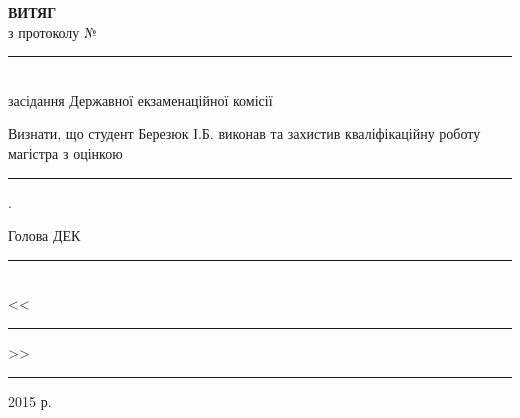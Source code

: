 \begin{titlepage}
\newcommand{\ul}[1]{\rule{#1}{0.1pt}}
\begin{spacing}{1.5}
\vspace*{4.5cm}
{\center
  {\bf ВИТЯГ}\\
  з протоколу № \ul{2.4cm}\\
  засідання Державної екзаменаційної комісії\\[2cm]}
{\noindent
  Визнати, що студент Березюк І.Б. виконав та захистив кваліфікаційну роботу магістра з оцінкою \hspace{0.5cm} \ul{6cm} .\\[1cm]}
{\flushright
  Голова ДЕК \ul{7.8cm}\\
  <<\ul{1cm}>> \ul{4cm} 2015 р.\\}
\end{spacing}
\end{titlepage}
